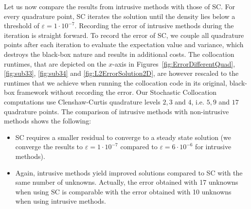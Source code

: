 Let us now compare the results from intrusive methods with those of SC. For every quadrature point, SC iterates the solution until the density lies below a threshold of $\varepsilon = 1\cdot 10^{-7}$. Recording the error of intrusive methods during the iteration is straight forward. To record the error of SC, we couple all quadrature points after each iteration to evaluate the expectation value and variance, which destroys the black-box nature and results in additional costs. The collocation runtimes, that are depicted on the $x$-axis in Figures~\ref{fig:ErrorDifferentQuad}, \ref{fig:sub33}, \ref{fig:sub34} and \ref{fig:L2ErrorSolution2D}, are however rescaled to the runtimes that we achieve when running the collocation code in its original, black-box framework without recording the error. Our Stochastic Collocation computations use Clenshaw-Curtis quadrature levels $2,3$ and $4$, i.e. $5,9$ and $17$ quadrature points. The comparison of intrusive methods with non-intrusive methods shows the following:
\begin{itemize}
\item SC requires a smaller residual to converge to a steady state solution (we converge the results to $\varepsilon = 1\cdot 10^{-7}$ compared to $\varepsilon = 6\cdot 10^{-6}$ for intrusive methods).
\item Again, intrusive methods yield improved solutions compared to SC with the same number of unknowns. Actually, the error obtained with 17 unknowns when using SC is comparable with the error obtained with 10 unknowns when using intrusive methods.
\end{itemize}


